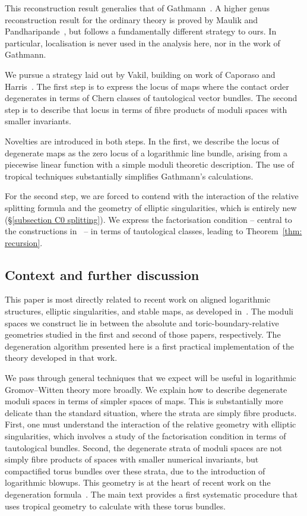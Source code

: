 \documentclass[11pt]{amsart}
\theoremstyle{definition}
\theoremstyle{definition}
\begin{document}
This reconstruction result generalies that of Gathmann~\cite{Ga}. A higher genus reconstruction result for the ordinary theory is proved by Maulik and Pandharipande~\cite{MaulikPandharipande}, but follows a fundamentally different strategy to ours. In particular, localisation is never used in the analysis here, nor in the work of Gathmann. 

We pursue a strategy laid out by Vakil, building on work of Caporaso and Harris~\cite{CH98,Vre}. The first step is to express the locus of maps where the contact order degenerates in terms of Chern classes of tautological vector bundles. The second step is to describe that locus in terms of fibre products of moduli spaces with smaller invariants. 

Novelties are introduced in both steps. In the first, we describe the locus of degenerate maps as the zero locus of a logarithmic line bundle, arising from a piecewise linear function with a simple moduli theoretic description. The use of tropical techniques substantially simplifies Gathmann's calculations.

For the second step, we are forced to contend with the interaction of the relative splitting formula and the geometry of elliptic singularities, which is entirely new (\S \ref{subsection C0 splitting}). We express the factorisation condition -- central to the constructions in~\cite{RSPW,RSPW2} -- in terms of tautological classes, leading to Theorem~\ref{thm: recursion}.

\subsection{Context and further discussion} This paper is most directly related to recent work on aligned logarithmic structures, elliptic singularities, and stable maps, as developed in~\cite{RSPW,RSPW2}. The moduli spaces we construct lie in between the absolute and toric-boundary-relative geometries studied in the first and second of those papers, respectively. The degeneration algorithm presented here is a first practical implementation of the theory developed in that work. 

We pass through general techniques that we expect will be useful in logarithmic Gromov--Witten theory more broadly. We explain how to describe degenerate moduli spaces in terms of simpler spaces of maps. This is substantially more delicate than the standard situation, where the strata are simply fibre products. First, one must understand the interaction of the relative geometry with elliptic singularities, which involves a study of the factorisation condition in terms of tautological bundles. Second, the degenerate strata of moduli spaces are not simply fibre products of spaces with smaller numerical invariants, but compactified torus bundles over these strata, due to the introduction of logarithmic blowups. This geometry is at the heart of recent work on the degeneration formula~\cite{R19}. The main text provides a first systematic procedure that uses tropical geometry to calculate with these torus bundles. 
\end{document}
